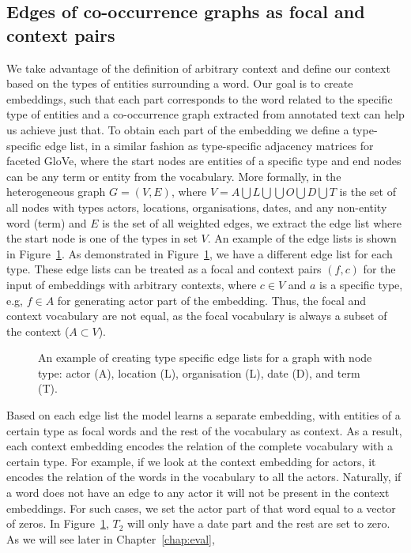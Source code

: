 \subsection{Edges of co-occurrence graphs as focal and context pairs}\label{sec:edges_as_pairs}
We take advantage of the definition of arbitrary context and define our context based on the types of entities surrounding a word. Our goal is to create embeddings, such that each part corresponds to the word related to the specific type of entities and a co-occurrence graph extracted from annotated text can help us achieve just that. To obtain each part of the embedding we define a type-specific edge list, in a similar fashion as type-specific adjacency matrices for faceted GloVe, where the start nodes are entities of a specific type and end nodes can be any term or entity from the vocabulary. More formally, in the heterogeneous graph $G=(V,E)$, where $V=A\bigcup  L\bigcup  \bigcup  O\bigcup  D\bigcup T $ is the set of all nodes with types actors, locations, organisations, dates, and any non-entity word (term) and $E$ is the set of all weighted edges, we extract the edge list where the start node is one of the types in set $V$. An example of the edge lists is shown in Figure~\ref{fig:facettedword2vec}. As demonstrated in Figure~\ref{fig:facettedword2vec}, we have a different edge list for each type. These edge lists can be treated as a focal and context pairs $(f,c)$ for the input of embeddings with arbitrary contexts, where $c \in V$ and $a$ is a specific type, e.g, $f \in A$ for generating actor part of the embedding. Thus, the focal and context vocabulary are not equal, as the focal vocabulary is always a subset of the context ($A \subset  V$). 
\begin{figure}
\centering 
\resizebox{0.80\textwidth}{0.28\textwidth}{      

}
\caption{An example of creating type specific edge lists for a graph with node type: actor (A), location (L), organisation (L), date (D), and term (T).}
\label{fig:facettedword2vec}
\end{figure} 
Based on each edge list the model learns a separate embedding, with entities of a certain type as focal words and the rest of the vocabulary as context. As a result, each context embedding encodes the relation of the complete vocabulary with a certain type. For example, if we look at the context embedding for actors, it encodes the relation of the words in the vocabulary to all the actors. Naturally, if a word does not have an edge to any actor it will not be present in the context embeddings. For such cases, we set the actor part of that word equal to a vector of zeros. In Figure~\ref{fig:facettedword2vec}, $T_2$ will only have a date part and the rest are set to zero. As we will see later in Chapter~\ref{chap:eval}, 

